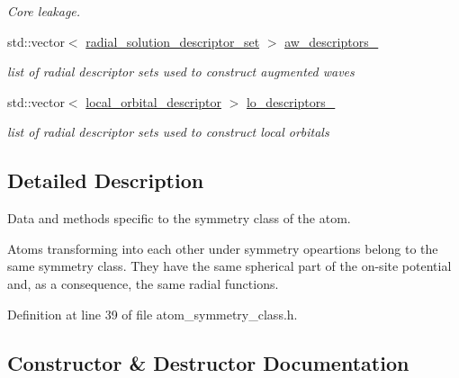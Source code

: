 \begin{DoxyCompactItemize}
\begin{DoxyCompactList}\small\item\em Core leakage. \end{DoxyCompactList}\item 
std\+::vector$<$ \hyperlink{descriptors_8h_aec4b6e691d842d5c6b06552800a478b3}{radial\+\_\+solution\+\_\+descriptor\+\_\+set} $>$ \hyperlink{classsirius_1_1_atom__symmetry__class_abfda6d0f0e8fdf62ace1b2d398b22e74}{aw\+\_\+descriptors\+\_\+}
\begin{DoxyCompactList}\small\item\em list of radial descriptor sets used to construct augmented waves \end{DoxyCompactList}\item 
std\+::vector$<$ \hyperlink{structlocal__orbital__descriptor}{local\+\_\+orbital\+\_\+descriptor} $>$ \hyperlink{classsirius_1_1_atom__symmetry__class_a28d09903836c52e4b0fc322776b3aab8}{lo\+\_\+descriptors\+\_\+}
\begin{DoxyCompactList}\small\item\em list of radial descriptor sets used to construct local orbitals \end{DoxyCompactList}\end{DoxyCompactItemize}


\subsection{Detailed Description}
Data and methods specific to the symmetry class of the atom. 

Atoms transforming into each other under symmetry opeartions belong to the same symmetry class. They have the same spherical part of the on-\/site potential and, as a consequence, the same radial functions. 

Definition at line 39 of file atom\+\_\+symmetry\+\_\+class.\+h.



\subsection{Constructor \& Destructor Documentation}
\hypertarget{classsirius_1_1_atom__symmetry__class_a08eaf2331397fd9b3ef83d44ea77e57c}{}
